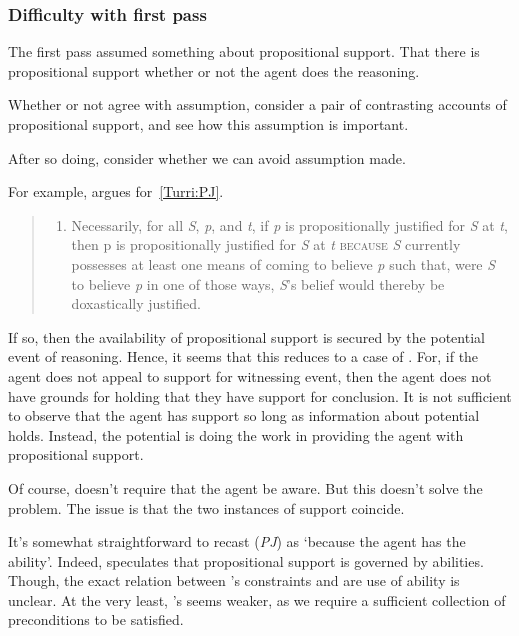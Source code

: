 \subsubsection{Difficulty with first pass}
\label{sec:diff-with-first}

\begin{note}[Overview]
  The first pass assumed something about propositional support.
  That there is propositional support whether or not the agent does the reasoning.

  Whether or not agree with assumption, consider a pair of contrasting accounts of propositional support, and see how this assumption is important.

  After so doing, consider whether we can avoid assumption made.
\end{note}

\begin{note}
  For example, \citeauthor{Turri:2010aa} argues for~\ref{Turri:PJ}.
  \begin{quote}
    \begin{enumerate}[label=(\textbf{PJ}), ref=(\textbf{PJ})]
    \item\label{Turri:PJ} Necessarily, for all \emph{S}, \emph{p}, and \emph{t}, if \emph{p} is propositionally justified for \emph{S} at \emph{t}, then p\emph{} is propositionally justified for \emph{S} at \emph{t} \textsc{because} \emph{S} currently possesses at least one means of coming to believe \emph{p} such that, were \emph{S} to believe \emph{p} in one of those ways, \emph{S}'s belief would thereby be doxastically justified.
    \end{enumerate}
  \end{quote}
  If so, then the availability of propositional support is secured by the potential event of reasoning.
  Hence, it seems that this reduces to a case of \AR{}.
  For, if the agent does not appeal to support for witnessing event, then the agent does not have grounds for holding that they have support for conclusion.
  It is not sufficient to observe that the agent has support so long as information about potential holds.
  Instead, the potential is doing the work in providing the agent with propositional support.

  Of course, \citeauthor{Turri:2010aa} doesn't require that the agent be aware.
  But this doesn't solve the problem.
  The issue is that the two instances of support coincide.

  It's somewhat straightforward to recast (\emph{PJ}) as `because the agent has the ability'.
  Indeed, \citeauthor{Turri:2010aa} speculates that propositional support is governed by abilities.
  Though, the exact relation between \citeauthor{Turri:2010aa}'s constraints and are use of ability is unclear.
  At the very least, \citeauthor{Turri:2010aa}'s seems weaker, as we require a sufficient collection of preconditions to be satisfied.
\end{note}

